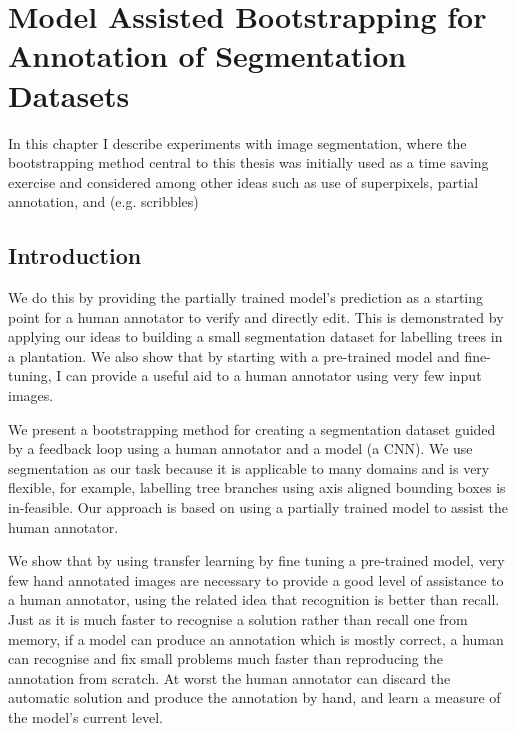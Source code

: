 \chapter{Model Assisted Bootstrapping for Annotation of Segmentation Datasets}
\label{chap:bootstrap} 
 
 


In this chapter I describe experiments with image segmentation, where the bootstrapping method central to this thesis was initially used as a time saving exercise and considered among other ideas such as use of superpixels, partial annotation, and  (e.g. scribbles)
 
 

\section {Introduction}



 We do this by providing the partially trained model's prediction as a starting point for a human annotator to verify and directly edit. This is demonstrated by applying our ideas to building a small segmentation dataset for labelling trees in a plantation. We also show that by starting with a pre-trained model and fine-tuning, I can provide a useful aid to a human annotator using very few input images.



We present a bootstrapping method for creating a segmentation dataset guided by a feedback loop using a human annotator and a model (a \gls{CNN}). We use segmentation as our task because it is applicable to many domains and is very flexible, for example, labelling tree branches using axis aligned bounding boxes is in-feasible. Our approach is based on using a partially trained model to assist the human annotator.

We show that by using transfer learning by fine tuning a pre-trained model, very few hand annotated images are necessary to provide a good level of assistance to a human annotator, using the related idea that recognition is better than recall. Just as it is much faster to recognise a solution rather than recall one from memory, if a model can produce an annotation which is mostly correct, a human can recognise and fix small problems much faster than reproducing the annotation from scratch. At worst the human annotator can discard the automatic solution and produce the annotation by hand, and learn a measure of the model's current level.

